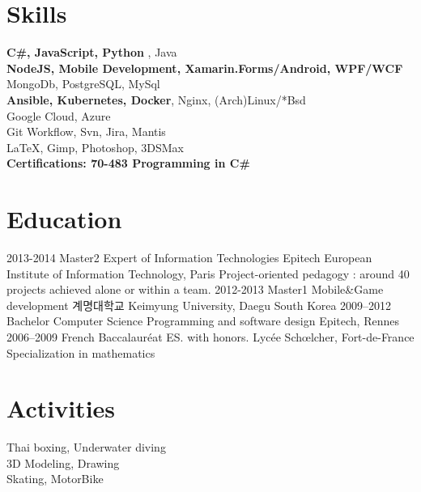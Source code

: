 \documentclass{emonides-cv}
\begin{document}
\section{Skills}
  \textbf{C\#, JavaScript, Python} , Java\\
  \textbf { NodeJS, Mobile Development, Xamarin.Forms/Android, WPF/WCF}  \\
  MongoDb, PostgreSQL, MySql\\
  \textbf { Ansible, Kubernetes, Docker}, Nginx, (Arch)Linux/*Bsd \\
  Google Cloud, Azure \\
  Git Workflow, Svn, Jira, Mantis\\
  \LaTeX, Gimp, Photoshop, 3DSMax\\
  \textbf { Certifications: 70-483 Programming in C\# }

\section{Education}
\begin{entrylist}
  \entry
    {2013-2014}
    {Master2 {\normalfont  Expert of Information Technologies }}
    {Epitech European Institute of Information Technology, Paris} {Project-oriented pedagogy : around 40 projects achieved alone or within a team.}
  \entry
    {2012-2013}
    {Master1 {\normalfont  Mobile\&Game development }}
    { {\sffamily 계명대학교} Keimyung University, Daegu South Korea} {}
  \entry
    {2009–2012}
    {Bachelor  {\normalfont Computer Science Programming and software design}}
    {Epitech, Rennes} {}
  \entry
    {2006–2009}
    {French Baccalauréat ES. {\normalfont with honors. }}
    {Lycée Schœlcher, Fort-de-France} { Specialization in mathematics }
\end{entrylist}

\section{Activities}
  Thai boxing, Underwater diving\\
  3D Modeling, Drawing\\
  Skating, MotorBike
  
\end{document}
